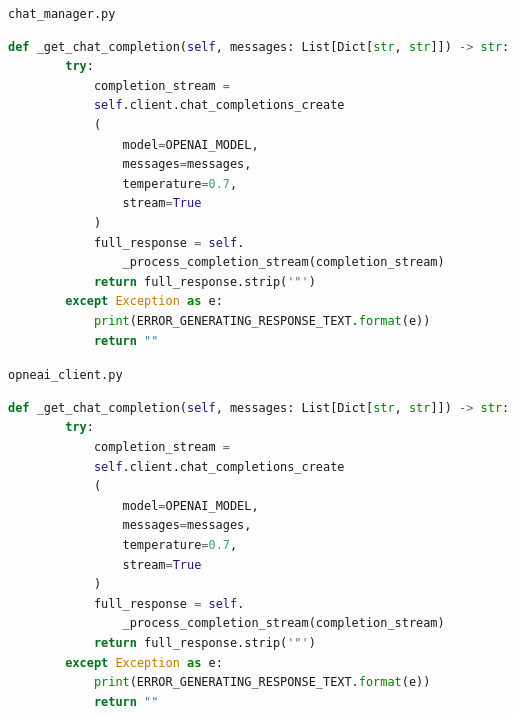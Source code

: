 \vskip 1.2cm
\texttt{chat\_manager.py}
\begin{lstlisting}[language=Python]
    def _get_chat_completion(self, messages: List[Dict[str, str]]) -> str:
        try:
            completion_stream = 
            self.client.chat_completions_create
            (
                model=OPENAI_MODEL,
                messages=messages,
                temperature=0.7,
                stream=True
            )
            full_response = self.
                _process_completion_stream(completion_stream)
            return full_response.strip('"')
        except Exception as e:
            print(ERROR_GENERATING_RESPONSE_TEXT.format(e))
            return ""
\end{lstlisting}
\vskip 1.2cm
\texttt{opneai\_client.py}
\begin{lstlisting}[language=Python]
    def _get_chat_completion(self, messages: List[Dict[str, str]]) -> str:
        try:
            completion_stream = 
            self.client.chat_completions_create
            (
                model=OPENAI_MODEL,
                messages=messages,
                temperature=0.7,
                stream=True
            )
            full_response = self.
                _process_completion_stream(completion_stream)
            return full_response.strip('"')
        except Exception as e:
            print(ERROR_GENERATING_RESPONSE_TEXT.format(e))
            return ""
\end{lstlisting}
\vskip 1.2cm

\clearpage

